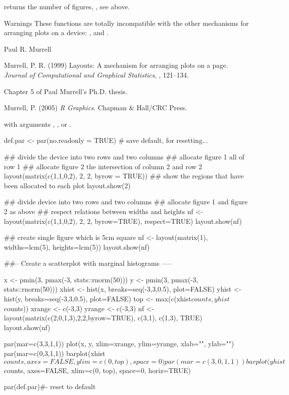 %
\begin{Value}
 returns the number of figures, , see above.
\end{Value}
%
\begin{Section}{Warnings}
These functions are totally incompatible with the other mechanisms for
arranging plots on a device: ,
 and .
\end{Section}
%
\begin{Author}\relax
Paul R. Murrell
\end{Author}
%
\begin{References}\relax
Murrell, P. R. (1999) Layouts: A mechanism for arranging plots on a page.
\emph{Journal of Computational and Graphical Statistics},
, 121--134.

Chapter 5 of Paul Murrell's Ph.D. thesis.

Murrell, P. (2005) \emph{R Graphics}. Chapman \& Hall/CRC Press.
\end{References}
%
\begin{SeeAlso}\relax
{} with arguments , , or
.
\end{SeeAlso}
%
\begin{Examples}
\begin{ExampleCode}
def.par <- par(no.readonly = TRUE) # save default, for resetting...

## divide the device into two rows and two columns
## allocate figure 1 all of row 1
## allocate figure 2 the intersection of column 2 and row 2
layout(matrix(c(1,1,0,2), 2, 2, byrow = TRUE))
## show the regions that have been allocated to each plot
layout.show(2)

## divide device into two rows and two columns
## allocate figure 1 and figure 2 as above
## respect relations between widths and heights
nf <- layout(matrix(c(1,1,0,2), 2, 2, byrow=TRUE), respect=TRUE)
layout.show(nf)

## create single figure which is 5cm square
nf <- layout(matrix(1), widths=lcm(5), heights=lcm(5))
layout.show(nf)


##-- Create a scatterplot with marginal histograms -----

x <- pmin(3, pmax(-3, stats::rnorm(50)))
y <- pmin(3, pmax(-3, stats::rnorm(50)))
xhist <- hist(x, breaks=seq(-3,3,0.5), plot=FALSE)
yhist <- hist(y, breaks=seq(-3,3,0.5), plot=FALSE)
top <- max(c(xhist$counts, yhist$counts))
xrange <- c(-3,3)
yrange <- c(-3,3)
nf <- layout(matrix(c(2,0,1,3),2,2,byrow=TRUE), c(3,1), c(1,3), TRUE)
layout.show(nf)

par(mar=c(3,3,1,1))
plot(x, y, xlim=xrange, ylim=yrange, xlab="", ylab="")
par(mar=c(0,3,1,1))
barplot(xhist$counts, axes=FALSE, ylim=c(0, top), space=0)
par(mar=c(3,0,1,1))
barplot(yhist$counts, axes=FALSE, xlim=c(0, top), space=0, horiz=TRUE)

par(def.par)#- reset to default
\end{ExampleCode}
\end{Examples}
